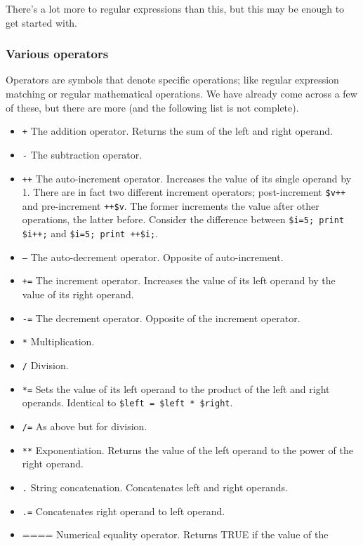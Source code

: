 \documentclass[11pt]{article}
\begin{document}
There's a lot more to regular expressions than this, but this may be enough to get
started with.
\subsubsection{Various operators}
\label{sec-5-7}


Operators are symbols that denote specific operations; like regular
expression matching or regular mathematical operations. We have already
come across a few of these, but there are more (and the following list
is not complete).

\begin{itemize}
\item \texttt{+} The addition operator. Returns the sum of the left and right
  operand.
\item \texttt{-} The subtraction operator.
\item \texttt{++} The auto-increment operator. Increases the value of its single
  operand by 1. There are in fact two different increment operators;
  post-increment \texttt{\$v++} and pre-increment \texttt{++\$v}. The former increments
  the value after other operations, the latter before. Consider the
  difference between \texttt{\$i=5; print \$i++;} and \texttt{\$i=5; print ++\$i;}.
\item \texttt{–} The auto-decrement operator. Opposite of auto-increment.
\item \texttt{+=} The increment operator. Increases the value of its left operand
  by the value of its right operand.
\item \texttt{-=} The decrement operator. Opposite of the increment operator.
\item \texttt{*} Multiplication.
\item \texttt{/} Division.
\item \texttt{*=} Sets the value of its left operand to the product of the left
  and right operands. Identical to \texttt{\$left = \$left * \$right}.
\item \texttt{/=} As above but for division.
\item \texttt{**} Exponentiation. Returns the value of the left operand to the
  power of the right operand.
\item \texttt{.} String concatenation. Concatenates left and right operands.
\item \texttt{.=} Concatenates right operand to left operand.
\item ==== Numerical equality operator. Returns TRUE if the value of the

\end{itemize}
\end{document}
